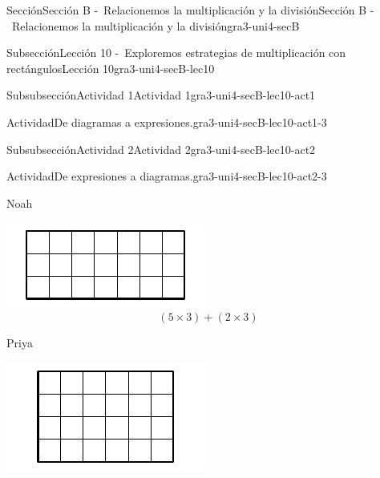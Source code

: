 \documentclass[twoside,10pt,]{article}
\begin{document}
\begin{sectionptx}{Sección}{Sección B -~Relacionemos la multiplicación y la división}{}{Sección B -~Relacionemos la multiplicación y la división}{}{}{gra3-uni4-secB}
\begin{subsectionptx}{Subsección}{Lección 10 -~Exploremos estrategias de multiplicación con rectángulos}{}{Lección 10}{}{}{gra3-uni4-secB-lec10}
\begin{subsubsectionptx}{Subsubsección}{Actividad 1}{}{Actividad 1}{}{}{gra3-uni4-secB-lec10-act1}
\begin{activity}{Actividad}{De diagramas a expresiones.}{gra3-uni4-secB-lec10-act1-3}
\begin{enumerate}
\begin{enumerate}
\end{enumerate}
%
\end{enumerate}
\end{activity}%
\end{subsubsectionptx}
%
%
\typeout{************************************************}
\typeout{************************************************}
%
\begin{subsubsectionptx}{Subsubsección}{Actividad 2}{}{Actividad 2}{}{}{gra3-uni4-secB-lec10-act2}
\begin{activity}{Actividad}{De expresiones a diagramas.}{gra3-uni4-secB-lec10-act2-3}%
\begin{sidebyside}{3}{0.0166666666666667}{0.0166666666666667}{0.0333333333333333}%
\begin{sbspanel}{0.3}%
Noah%
\par
\includegraphics[width=\linewidth]{external/svg-source/tikz-file-153051.pdf}
%
\begin{equation*}
(5\times 3)+(2 \times 3)
\end{equation*}
%
\end{sbspanel}%
\begin{sbspanel}{0.3}%
Priya%
\par
\includegraphics[width=\linewidth]{external/svg-source/tikz-file-153053.pdf}

\end{sbspanel}
\end{sidebyside}
\end{activity}
\end{subsubsectionptx}
\end{subsectionptx}
\end{sectionptx}
\end{document}
